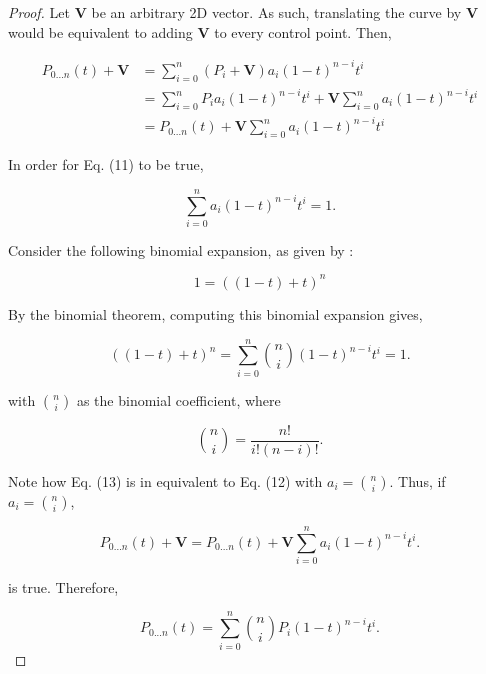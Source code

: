 \documentclass[12pt, oneside]{article}   	%
\numberwithin{figure}{section}
\begin{document}
\begin{proof}
Let \(\mathbf{V}\) be an arbitrary 2D vector. As such, translating the curve by \(\mathbf{V}\) would be equivalent to adding \(\mathbf{V}\) to every control point. Then,

\begin{equation}\begin{split}
P_{0...n}(t) + \mathbf{V}	& =\displaystyle\sum_{i=0}^{n} (P_i+\mathbf{V})a_{i}(1-t)^{n-i}t^i \\ 
					& = \displaystyle\sum_{i=0}^{n} P_ia_{i}(1-t)^{n-i}t^i + \mathbf{V}\displaystyle\sum_{i=0}^{n} a_{i}(1-t)^{n-i}t^i \\
					& = P_{0...n}(t) + \mathbf{V}\displaystyle\sum_{i=0}^{n} a_{i}(1-t)^{n-i}t^i
\end{split}\end{equation}

In order for Eq. (11) to be true,

\begin{equation}
\displaystyle\sum_{i=0}^{n} a_{i}(1-t)^{n-i}t^i = 1.
\end{equation}

Consider the following binomial expansion, as given by :

\begin{displaymath}
1 = ((1-t) + t)^n
\end{displaymath}

By the binomial theorem, computing this binomial expansion gives,

\begin{equation}
((1-t) + t)^n = \displaystyle\sum_{i=0}^{n} \binom{n}{i}(1-t)^{n-i}t^i = 1.
\end{equation}

with \(\binom{n}{i}\) as the binomial coefficient, where

\begin{displaymath}
\binom{n}{i} = \frac{n!}{i!(n-i)!}. 
\end{displaymath}

Note how Eq. (13) is in equivalent to Eq. (12) with \(a_i=\binom{n}{i}\). Thus, if \(a_i=\binom{n}{i}\),

\begin{displaymath}
P_{0...n}(t) + \mathbf{V} = P_{0...n}(t) + \mathbf{V}\displaystyle\sum_{i=0}^{n} a_{i}(1-t)^{n-i}t^i.
\end{displaymath}

is true. Therefore,

\begin{equation}
P_{0...n}(t) = \displaystyle\sum_{i=0}^{n} \binom{n}{i}P_i(1-t)^{n-i}t^i.
\end{equation}

\qedhere

\end{proof}
\end{document}
